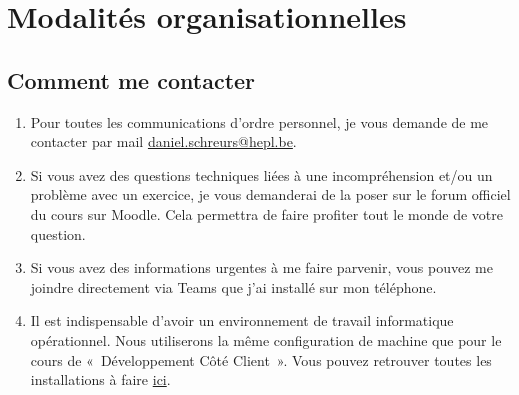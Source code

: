 \section{Modalités organisationnelles}
\subsection{Comment me contacter}
\begin{enumerate}
    \item Pour toutes les communications d'ordre personnel, je vous demande de me contacter par mail \href{mailto:daniel.schreurs@hepl.be}{daniel.schreurs@hepl.be}.
    \item Si vous avez des questions techniques liées à une incompréhension et/ou un problème avec un exercice, je vous demanderai de la poser sur le forum officiel du cours sur Moodle. Cela permettra de faire profiter tout le monde de votre question.
    \item Si vous avez des informations urgentes à me faire parvenir, vous pouvez me joindre directement via Teams que j'ai installé sur mon téléphone.
    \item Il est indispensable d'avoir un environnement de travail informatique opérationnel. Nous utiliserons la même configuration de machine que pour le cours de «~Développement Côté Client~». Vous pouvez retrouver toutes les installations à faire \href{https://github.com/tecg-dcc/js-ressources#environnement-de-travail}{ici}.
\end{enumerate}


\clearpage
\printbibliography



